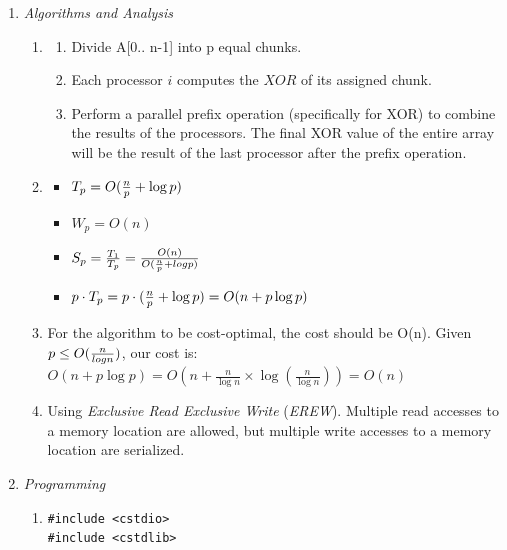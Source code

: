\documentclass{article}
\begin{document}
\begin{enumerate}
    \item \textit{Algorithms and Analysis}
        \begin{enumerate}
            \item 
                \begin{enumerate}
                    \item Divide A[0.. n-1] into p equal chunks.
                    \item Each processor $i$ computes the $XOR$ of its assigned chunk.
                    \item Perform a parallel prefix operation (specifically for XOR) to combine the results of the processors. The final XOR value of the entire array will be the result of the last processor after the prefix operation.
                \end{enumerate}
            \item 
                \begin{itemize}
                    \item $T_p = O({n \over p} + \log p)$
                    \item $W_p = O(n)$
                    \item $S_p = {T_1 \over T_p} = { O(n) \over O({n \over p} + log p)}$
                    \item $p \cdot T_p = p \cdot ({n \over p} + \log p) = O(n + p \log p)$
                \end{itemize}
            \item For the algorithm to be cost-optimal, the cost should be O(n). Given $p \leq O({n
                \over log n})$, our cost is: $O(n + p \log p) = O\left(n + \frac{n}{\log n} \times
                \log\left(\frac{n}{\log n}\right)\right) = O(n)$
            \item Using \textit{Exclusive Read Exclusive Write} (\textit{EREW}). Multiple read
                accesses to a memory location are allowed, but multiple write accesses to a memory
                location are serialized. 
        \end{enumerate}

    \item \textit{Programming}
        \begin{enumerate}
            \item
                \begin{lstlisting}
#include <cstdio>
#include <cstdlib>


\end{lstlisting}
\end{enumerate}
\end{enumerate}
\end{document}
